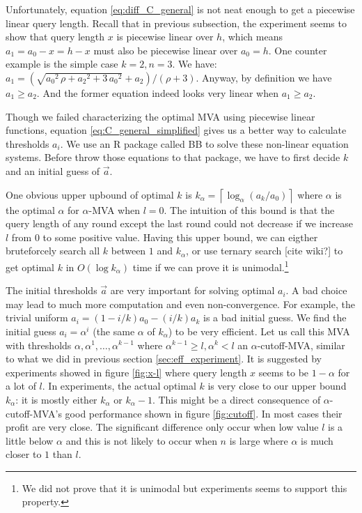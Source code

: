 Unfortunately, equation
\ref{eq:diff_C_general} is not neat enough to get a piecewise linear query length.
Recall that in previous subsection, the experiment seems to show that query length $x$ is
piecewise linear over $h$, which means $a_1 = a_0-x = h-x$ must also be
piecewise linear over $a_0 = h$.  One counter example is the simple case $k = 2, n =
3$. We have: $a_1 =
(\sqrt{{a_0}^{2}\,\rho+{a_2}^{2}+3\,{a_0}^{2}}+a_2)/(\rho+3)$.  Anyway, by
definition we have $a_1 \geq a_2$. And
the former equation indeed looks very linear when $a_1 \geq a_2$.

Though we failed characterizing the optimal MVA using piecewise linear
functions, equation \ref{eq:C_general_simplified} gives us a better way to
calculate thresholds $a_i$. We use an R package called BB \cite{Varadhan2009:BB} to
solve these non-linear equation systems. Before throw those equations to that
package, we have to first decide $k$ and an initial guess of $\vec a$.

One obvious upper upbound of optimal $k$ is $k_\alpha = \left\lceil \log_{\alpha}
\left(a_k/a_0\right) \right\rceil$ where $\alpha$ is the optimal $\alpha$ for
$\alpha$-MVA when $l = 0$. The intuition of this bound is that the query length
of any round except the last round could not decrease if we increase $l$ from $0$ to
some positive value. 
Having this upper bound, we can eigther bruteforcely
search all $k$ between $1$ and $k_\alpha$, or use ternary search [cite wiki?] to get optimal
$k$ in $O(\log k_\alpha)$ time if we can prove it is unimodal.\footnote{We
did not prove that it is unimodal but experiments seems to support this
property.}

The initial thresholds $\vec a$ are very important for solving optimal $a_i$. A bad choice may
lead to much more computation and even non-convergence. For example, the
trivial uniform $a_i = (1-i/k)a_0 - (i/k) a_k$ is a bad initial guess. We
find the initial guess $a_i = \alpha^i$ (the same $\alpha$ of $k_\alpha$) to be very efficient.
Let us call this MVA with thresholds $\alpha, \alpha^1, \ldots, \alpha^{k-1}$
where $\alpha^{k-1} \geq l, \alpha^k < l$ an $\alpha$-cutoff-MVA, similar to what we did in
previous section \ref{sec:eff_experiment}.  It is suggested by experiments
showed in figure \ref{fig:x-l} where query length $x$ seems to be $1-\alpha$ for a lot of
$l$. In experiments, the actual optimal $k$ is very close to our upper bound
$k_\alpha$: it is mostly either $k_\alpha$ or $k_\alpha-1$.  This might be a
direct consequence of $\alpha$-cutoff-MVA's good performance shown in figure
\ref{fig:cutoff}. In most cases their profit are very close.
The significant difference only occur when low value $l$ is a little below
$\alpha$ and this is not likely to occur when $n$ is large where $\alpha$ is
much closer to $1$ than $l$.

